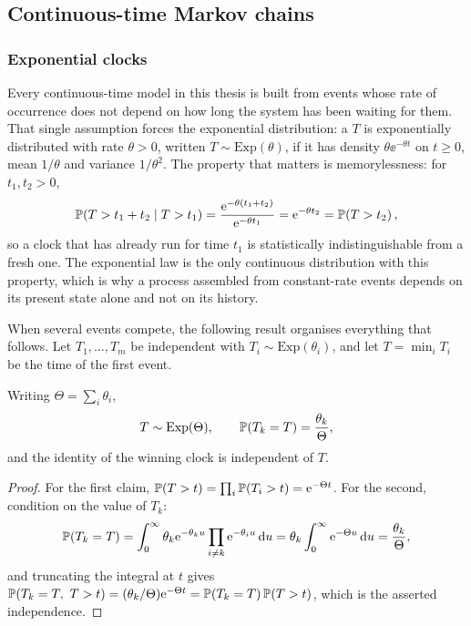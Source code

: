 \subsection{Continuous-time Markov chains}
\label{m:sec:ctmc}

\subsubsection{Exponential clocks}
\label{m:sec:exp}

Every continuous-time model in this thesis is built from events whose rate of
occurrence does not depend on how long the system has been waiting for them.
That single assumption forces the exponential distribution: a \rv{} $T$ is
exponentially distributed with rate $\theta>0$, written
$T\sim\mathrm{Exp}(\theta)$, if it has density $\theta\ee^{-\theta t}$ on
$t\ge0$, mean $1/\theta$ and variance $1/\theta^2$. The property that matters is
memorylessness: for $t_1,t_2>0$,
\begin{equation}
\label{m:eq:memoryless}
\mathbb{P}\!\left(T > t_1+t_2 \mid T > t_1\right)
= \frac{\mathrm{e}^{-\theta(t_1+t_2)}}{\mathrm{e}^{-\theta t_1}}
= \mathrm{e}^{-\theta t_2}
= \mathbb{P}\!\left(T > t_2\right),
\end{equation}
so a clock that has already run for time $t_1$ is statistically
indistinguishable from a fresh one. The exponential law is the only continuous
distribution with this property, which is why a process assembled from
constant-rate events depends on its present state alone and not on its history.

When several events compete, the following result organises everything that
follows. Let $T_1,\dots,T_m$ be independent with $T_i\sim\mathrm{Exp}(\theta_i)$,
and let $T=\min_iT_i$ be the time of the first event.

\begin{proposition}
\label{m:prop:race}
Writing $\Theta=\sum_i\theta_i$,
\begin{equation}
\label{m:eq:race}
T \sim \mathrm{Exp}(\Theta),
\qquad
\mathbb{P}\!\left(T_k = T\right) = \frac{\theta_k}{\Theta},
\end{equation}
and the identity of the winning clock is independent of $T$.
\end{proposition}

\begin{proof}
For the first claim, $\mathbb{P}\!\left(T>t\right)=\prod_i\mathbb{P}\!\left(T_i>t\right)=\mathrm{e}^{-\Theta t}$. For the
second, condition on the value of $T_k$:
\begin{equation*}
\mathbb{P}\!\left(T_k = T\right)
= \int_0^\infty \theta_k\mathrm{e}^{-\theta_k u}\prod_{i\neq k}\mathrm{e}^{-\theta_i u}\,\mathrm{d} u
= \theta_k\int_0^\infty \mathrm{e}^{-\Theta u}\,\mathrm{d} u
= \frac{\theta_k}{\Theta},
\end{equation*}
and truncating the integral at $t$ gives
$\pr{T_k=T,\ T>t}=(\theta_k/\Theta)\ee^{-\Theta t}
=\pr{T_k=T}\pr{T>t}$, which is the asserted independence.
\end{proof}

